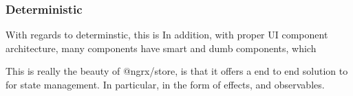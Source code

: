 \subsubsection{Deterministic}
With regards to determinstic, this is
In addition, with proper UI component architecture, many components have
smart and dumb components, which

This is really the beauty of @ngrx/store, is that it offers a end to end
solution to for state management. In particular, in the form of effects, and
observables.

